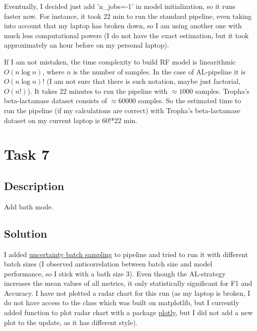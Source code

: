 \documentclass[a4paper,10pt]{article}
\begin{document}
Eventually, I decided just add 'n\_jobs=-1' in model initialization, so it runs faster now. For instance, it took 22 min to run the standard pipeline, even taking into account that my laptop has broken down, so I am using another one with much less computational powers (I do not have the exact estimation, but it took approximately an hour before on my personal laptop). 

If I am not mistaken, the time complexity to build RF model is linearithmic $O(n\log{}n)$, where $n$ is the number of samples. In the case of AL-pipeline it is $O(n\log{}n)!$ (I am not sure that there is such notation, maybe just factorial, $O(n!)$). It takes 22 minutes to run the pipeline with $\approx 1000$ samples. Tropha's beta-lactamase dataset consists of $\approx60000$ samples. So the estimated time to run the pipeline (if my calculations are correct) with Tropha's beta-lactamase dataset on my current laptop is 60!*22 min.

\section{Task 7}

\subsection{Description}
Add bath mode.
\subsection{Solution}
I added \href{https://modal-python.readthedocs.io/en/latest/content/query_strategies/ranked_batch_mode.html}{uncertainty batch sampling} to pipeline and tried to run it with different batch sizes (I observed anticorrelation between batch size and model performance, so I stick with a bath size 3). Even though the AL-strategy increases the mean values of all metrics, it only statistically significant for F1 and Accuracy. I have not plotted a radar chart for this run (as my laptop is broken, I do not have access to the class which was built on matplotlib, but I currently added function to plot radar chart with a package \href{https://plotly.com/}{plotly}, but I did not add a new plot to the update, as it has different style).


\medskip



\end{document}
